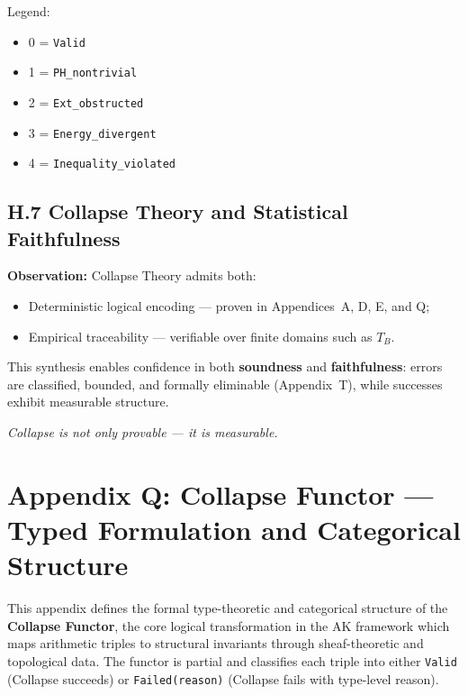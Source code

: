 \documentclass[11pt]{article}
\begin{document}
\vspace{0.5em}
\noindent
Legend:
\begin{itemize}
  \item 0 = \texttt{Valid}
  \item 1 = \texttt{PH\_nontrivial}
  \item 2 = \texttt{Ext\_obstructed}
  \item 3 = \texttt{Energy\_divergent}
  \item 4 = \texttt{Inequality\_violated}
\end{itemize}

\subsection*{H.7 Collapse Theory and Statistical Faithfulness}

\textbf{Observation:} Collapse Theory admits both:
\begin{itemize}
  \item Deterministic logical encoding — proven in Appendices~A, D, E, and Q;
  \item Empirical traceability — verifiable over finite domains such as \( T_B \).
\end{itemize}

This synthesis enables confidence in both \textbf{soundness} and \textbf{faithfulness}:  
errors are classified, bounded, and formally eliminable (Appendix~T), while successes  
exhibit measurable structure.

\begin{center}
\textit{Collapse is not only provable — it is measurable.}
\end{center}




\section*{Appendix Q: Collapse Functor — Typed Formulation and Categorical Structure}

This appendix defines the formal type-theoretic and categorical structure of the \textbf{Collapse Functor},  
the core logical transformation in the AK framework which maps arithmetic triples to structural invariants  
through sheaf-theoretic and topological data. The functor is partial and classifies each triple into either  
\texttt{Valid} (Collapse succeeds) or \texttt{Failed(reason)} (Collapse fails with type-level reason).
\end{document}
